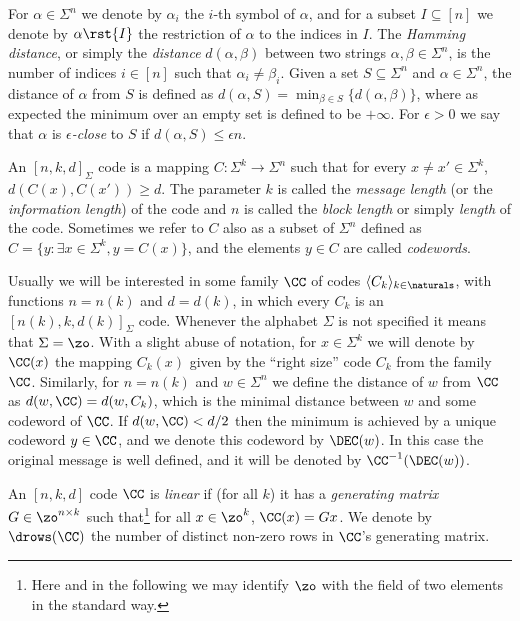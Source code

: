 For $\alpha \in \Sigma^n$ we denote by $\alpha_i$ the 
%
$i$-th 
symbol of $\alpha$, and for a subset $I \subseteq [n]$ we denote by $\alpha\rst{I}$ the restriction of $\alpha$ to the indices in $I$.
The \emph{Hamming distance}, or simply the \emph{distance} $d(\alpha,\beta)$ between two strings $\alpha,\beta \in \Sigma^n$, is the number of indices $i \in [n]$ such that
$\alpha_i \ne \beta_i$. Given a set $S \subseteq \Sigma^n$ and $\alpha \in \Sigma^n$, the distance of $\alpha$ from $S$ is defined as $d(\alpha,S) = \min_{\beta \in S} \{d(\alpha,\beta)\}$, where as expected the minimum over an empty set is defined to be $+\infty$. For $\epsilon >0$ we say that $\alpha$ is \emph{$\epsilon$-close} to $S$ if $d(\alpha,S) \leq \epsilon n$.

An $[n,k,d]_\Sigma$ code is a mapping $C:\Sigma^k \to \Sigma^n$ such that
for every $x \ne x' \in \Sigma^k$, $d(C(x),C(x')) \geq d$. The
parameter $k$ is called the \emph{message length} (or the
\emph{information length}) of the code and $n$ is called the
\emph{block length} or simply \emph{length} of the code. Sometimes we
refer to $C$ also as a subset of $\Sigma^n$ defined as $C = \{y:
\exists x \in \Sigma^k, y=C(x)\}$, and the elements $y \in C$ are called \emph{codewords}.

Usually we will be interested in some family $\CC$ of codes $\langle C_k \rangle_{k \in \naturals}$, with functions $n=n(k)$ and $d=d(k)$, in which every $C_k$ is an $[n(k),k,d(k)]_\Sigma$ code. Whenever the alphabet $\Sigma$ is not specified it means that $\Sigma = \zo$. With a slight abuse of notation, for $x \in \Sigma^k$ we will denote by $\CC(x)$ the mapping $C_k(x)$ given by the ``right size'' code $C_k$ from the family $\CC$.
Similarly, for $n=n(k)$ and $w \in \Sigma^n$ we define the distance of $w$ from $\CC$ as $d(w,\CC) = d(w,C_k)$, which is the minimal distance between $w$ and some codeword of $\CC$.
If $d(w,\CC) < d/2$ then the minimum is achieved by a unique codeword $y \in \CC$, and we denote this codeword by $\DEC(w)$.
In this case the original message is well defined, and it will be denoted by $\CC^{-1}(\DEC(w))$.

An $[n,k,d]$ code $\CC$ is \emph{linear} if (for all $k$) it has a \emph{generating matrix} $G \in \zo^{n \times k}$ such that\footnote{Here and in the following we may identify $\zo$ with the field of two elements in the standard way.} for all $x \in \zo^k$, $\CC(x) = Gx$. We denote by $\drows(\CC)$ the number of distinct non-zero rows in $\CC$'s generating
 matrix.

